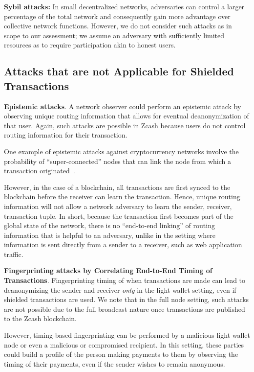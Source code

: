 \documentclass{article}
\begin{document}
\textbf{Sybil attacks:} In small decentralized networks, adversaries can
control a larger percentage of the total network and consequently gain more
advantage over collective network functions. However, we do not consider such
attacks as in scope to our assessment; we assume an adversary with sufficiently
limited resources as to require participation akin to honest users.

\subsection{Attacks that are not Applicable for Shielded Transactions}

\textbf{Epistemic attacks}. A network observer could perform an epistemic
attack by observing unique routing information that allows for eventual
deanonymization of that user. Again, such attacks are possible in Zcash because
users do not control routing information for their transaction.

One example of epistemic attacks against cryptocurrency networks involve the
probability of ``super-connected'' nodes that can link the node from which a
transaction originated~\cite{dandelion, fanti2018dandelion}.

However, in the case of a blockchain, all transactions are first synced to the
blockchain before the receiver can learn the transaction. Hence, unique routing
information will not allow a network adversary to learn the sender, receiver,
transaction tuple. In short, because the transaction first becomes part of the
global state of the network, there is no ``end-to-end linking'' of routing
information that is helpful to an adversary, unlike in the setting where
information is sent directly from a sender to a receiver, such as web
application traffic.

\textbf{Fingerprinting attacks by Correlating End-to-End Timing of Transactions}.
Fingerprinting timing of when transactions are made
can lead to deanonymizing the sender and
receiver \emph{only} in the light wallet setting, even if shielded transactions
are used. We note that in the full node setting, such attacks are not possible
due to the full broadcast nature once transactions are published to the Zcash
blockchain.

However, timing-based fingerprinting can be performed by a
malicious light wallet node or even a malicious or compromised recipient. In
this setting, these parties could build a profile of the person making payments
to them by observing the timing of their payments, even if the sender wishes to remain
anonymous.
\end{document}
